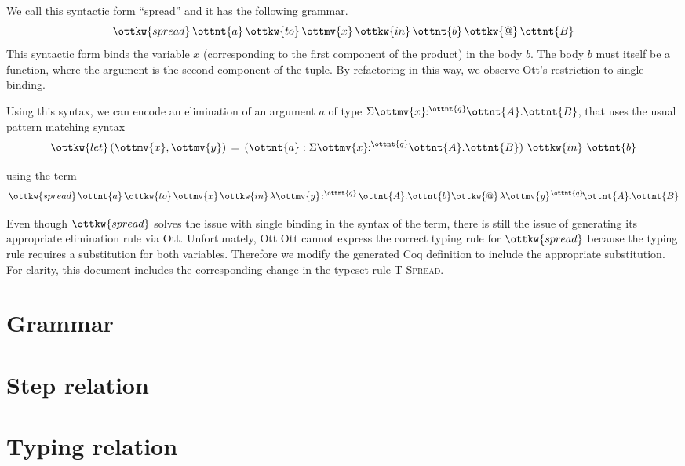 \documentclass{article}
\begin{document}
We call this syntactic form ``spread'' and it has the following grammar.
\[
 \ottkw{spread}\,  \ottnt{a} \, \ottkw{to}\,  \ottmv{x} \, \ottkw{in}\,  \ottnt{b}\, \ottkw{@}\, \ottnt{B}
\]
This syntactic form binds the variable $x$ (corresponding to the first
component of the product) in the body $b$. The body $b$ must itself be a
function, where the argument is the second component of the tuple. By 
refactoring in this way, we observe Ott's restriction to single binding. 

Using this syntax, we can encode an elimination of an argument $a$
of type $ \Sigma  \ottmv{x} \!\!:^ \ottnt{q} \!\! \ottnt{A} . \ottnt{B} $, that uses
the usual pattern matching syntax
\[ 
     \ottkw{let}\, (\ottmv{x},\ottmv{y}) \,=\, (\ottnt{a} : \Sigma  \ottmv{x} \!\!:^ \ottnt{q} \!\! \ottnt{A} . \ottnt{B}) \ \ottkw{in}\  \ottnt{b} 
\] 

using the term
\[
   \ottkw{spread}\,  \ottnt{a} \, \ottkw{to}\,  \ottmv{x} \, \ottkw{in}\,  \lambda \ottmv{y} \!:^ \ottnt{q} \! \ottnt{A} . \ottnt{b}
   \ottkw{@}\, \lambda \ottmv{y} \!\:^\ottnt{q}\! \ottnt{A} . \ottnt{B}
\]

Even though $\ottkw{spread}$ solves the issue with single binding in the
syntax of the term, there is still the issue of generating its appropriate
elimination rule via Ott. Unfortunately, Ott Ott cannot express the correct
typing rule for $\ottkw{spread}$ because the typing rule requires a
substitution for both variables.  Therefore we modify the generated Coq
definition to include the appropriate substitution. For clarity, this document
includes the corresponding change in the typeset rule \textsc{T-Spread}.


\section{Grammar}

\ottgrammartabular{
\ottusage\ottinterrule
\otttm\ottinterrule
\ottcontext\ottinterrule
\ottD\ottafterlastrule
}


\section{Step relation}
\ottdefnsJOp{} 
\section{Typing relation}
\end{document}
